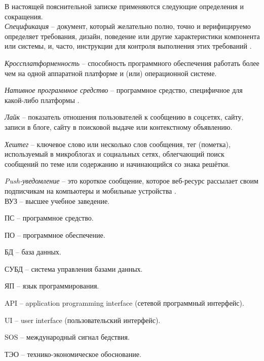 \label{sec:definitions}

В настоящей пояснительной записке применяются следующие определения и сокращения.
\\

\emph{Спецификация} -- документ, который желательно полно, точно и верифицируемо определяет требования, дизайн, поведение или другие характеристики компонента или системы, и, часто, инструкции для контроля выполнения этих требований \cite{istqb_specification}.


\emph{Кроссплатформенность} -- способность программного обеспечения работать более чем на одной аппаратной платформе и (или) операционной системе.

\emph{Нативное программное средство} -- программное средство, специфичное для какой-либо платформы \cite{habr_crossplatform}.

\emph{Лайк} -- показатель отношения пользователей к сообщению в соцсетях, сайту, записи в блоге, сайту в поисковой выдаче или контекстному объявлению.

\emph{Хештег} -- ключевое слово или несколько слов сообщения, тег (пометка), используемый в микроблогах и социальных сетях, облегчающий поиск сообщений по теме или содержанию и начинающийся со знака решётки.

\emph{Push-уведомление} -- это короткое сообщение, которое веб-ресурс рассылает своим подписчикам на компьютеры и мобильные устройства \cite{pushNotification}.
\\

ВУЗ -- высшее учебное заведение.

ПС -- программное средство.

ПО -- программное обеспечение.

БД -- база данных.

СУБД -- система управления базами данных.

ЯП -- язык программирования.

API -- application programming interface (сетевой программный интерфейс).

UI -- user interface (пользовательский интерфейс).

SOS -- международный сигнал бедствия.

ТЭО -- технико-экономическое обоснование.


\label{sec:introduction}

